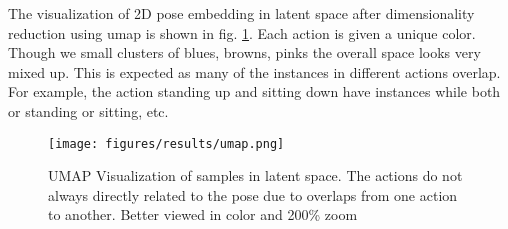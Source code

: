 The visualization of 2D pose embedding in latent space after dimensionality reduction using \ac{umap} is shown in fig. \ref{fig:latentspace}. Each action is given a unique color. Though we small clusters of blues, browns, pinks the overall space looks very mixed up. This is expected as many of the instances in different actions overlap. For example, the action standing up and sitting down have instances while both or standing or sitting, etc.  

\begin{figure}[h]
    \centering
    \texttt{[image: figures/results/umap.png]}
    \caption{UMAP Visualization of samples in latent space. The actions do not always directly related to the pose due to overlaps from one action to another. Better viewed in color and 200\% zoom}
    \label{fig:latentspace}
\end{figure}